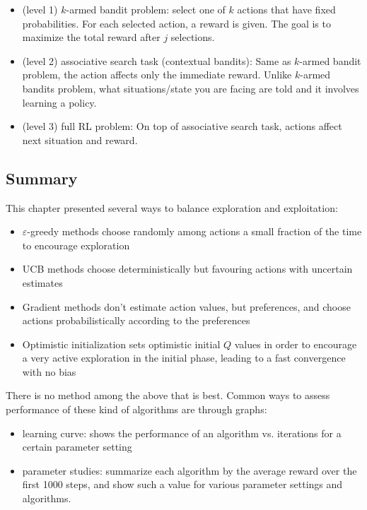 \documentclass[lang=en,mode=geye,device=normal,color=blue,14pt]{elegantnote}
\DeclareMathOperator*{\1}{\mathbbm{1}}
\begin{document}
\begin{itemize}
\item (level 1) $k$-armed bandit problem: select one of $k$ actions that have fixed probabilities. For each selected action, a reward is given. The goal is to maximize the total reward after $j$ selections.
\item (level 2) associative search task (contextual bandits): Same as $k$-armed bandit problem, the action affects only the immediate reward. Unlike $k$-armed bandits problem, what situations/state you are facing are told and it involves learning a policy.
\item (level 3) full RL problem: On top of associative search task, actions affect next situation and reward.
\end{itemize}

\subsection{Summary}

This chapter presented several ways to balance exploration and exploitation:

\begin{itemize}
\item $\varepsilon$-greedy methods choose randomly among actions a small fraction of the time to encourage exploration
\item UCB methods choose deterministically but favouring actions with uncertain estimates
\item Gradient methods don't estimate action values, but preferences, and choose actions probabilistically according to the preferences
\item Optimistic initialization sets optimistic initial $Q$ values in order to encourage a very active exploration in the initial phase, leading to a fast convergence with no bias
\end{itemize}

There is no method among the above that is best. Common ways to assess performance of these kind of algorithms are through graphs:
\begin{itemize}
\item learning curve: shows the performance of an algorithm vs. iterations for a certain parameter setting
\item parameter studies: summarize each algorithm by the average reward over the first 1000 steps, and show such a value for various parameter settings and algorithms.
\end{itemize}
\end{document}

